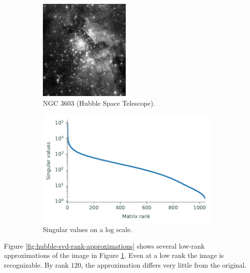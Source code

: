 \begin{figure}[H] %
\captionsetup[subfigure]{justification=centering}
\centering
\begin{subfigure}{.49\textwidth}
    \centering
    \includegraphics[height=5cm]{figures/hubble_gray.jpg}
    \caption{NGC 3603 (Hubble Space Telescope).}
    \label{fig:hubble-original-gray}
\end{subfigure}
%
\begin{subfigure}{.49\textwidth}
    \centering
    \includegraphics[width=\linewidth]{figures/hubble_svals.pdf}
    \caption{Singular values on a log scale.}
    \label{fig:hubble-log-svals}
\end{subfigure}
\caption{}
\label{fig:hubble}
\end{figure}

Figure \ref{fig:hubble-svd-rank-approximations} shows several low-rank approximations of the image in Figure \ref{fig:hubble-original-gray}.
Even at a low rank the image is recognizable.
By rank $120$, the approximation differs very little from the original.

